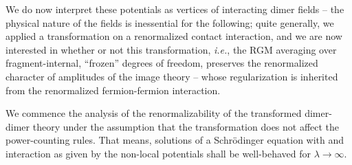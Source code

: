 \documentclass[onecolumn,preprint,superscriptaddress,nofootinbib,notitlepage,10pt,linenumbers]{revtex4-1}
\newcommand{\ie}{\textit{i.e.}\;}
\begin{document}
We do now interpret these potentials as vertices of interacting dimer fields -- the physical nature of the fields is
inessential for the following; quite generally, we applied a transformation on a renormalized contact interaction, and
we are now interested in whether or not this transformation, \ie, the RGM averaging over fragment-internal, ``frozen''
degrees of freedom, preserves the renormalized character of amplitudes of the image theory -- whose regularization is
inherited from the renormalized fermion-fermion interaction.

We commence the analysis of the renormalizability of the transformed dimer-dimer theory under the assumption that
the transformation does not affect the power-counting rules. That means, solutions of a Schr\"odinger equation
with and interaction as given by the non-local potentials shall be well-behaved for $\lambda\to\infty$.



\end{document}
